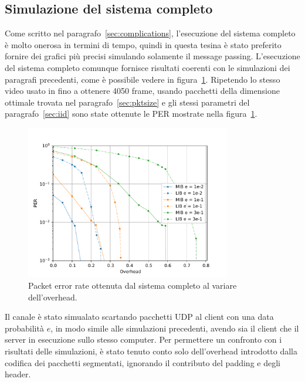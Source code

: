 \documentclass[italian, a4paper, 12pt]{article}
\begin{document}
\subsection{Simulazione del sistema completo}
Come scritto nel paragrafo~\ref{sec:complications}, l'esecuzione
del sistema completo è molto onerosa in termini di tempo, quindi in
questa tesina è stato preferito fornire dei grafici più precisi
simulando solamente il message passing.
%
L'esecuzione del sistema completo comunque fornisce risultati coerenti
con le simulazioni dei paragrafi precedenti, come è possibile vedere
in figura~\ref{fig:iid_real}.
%
Ripetendo lo stesso video usato in \cite{uep} fino a ottenere 4050
frame, usando pacchetti della dimensione ottimale trovata nel
paragrafo~\ref{sec:pktsize} e gli stessi parametri del
paragrafo~\ref{sec:iid} sono state ottenute le PER mostrate nella
figura~\ref{fig:iid_real}.
%
\begin{figure}[H]
  \centering
  \includegraphics[width=0.8\textwidth]{plot_iid_real}
  \caption{Packet error rate ottenuta dal sistema completo al variare
    dell'overhead.}
  \label{fig:iid_real}
\end{figure}
%
Il canale è stato simualato scartando pacchetti UDP al client con una
data probabilità $e$, in modo simile alle simulazioni precedenti,
avendo sia il client che il server in esecuzione sullo stesso
computer.
%
Per permettere un confronto con i risultati delle simulazioni, è stato
tenuto conto solo dell'overhead introdotto dalla codifica dei
pacchetti segmentati, ignorando il contributo del padding e degli
header.
\end{document}
